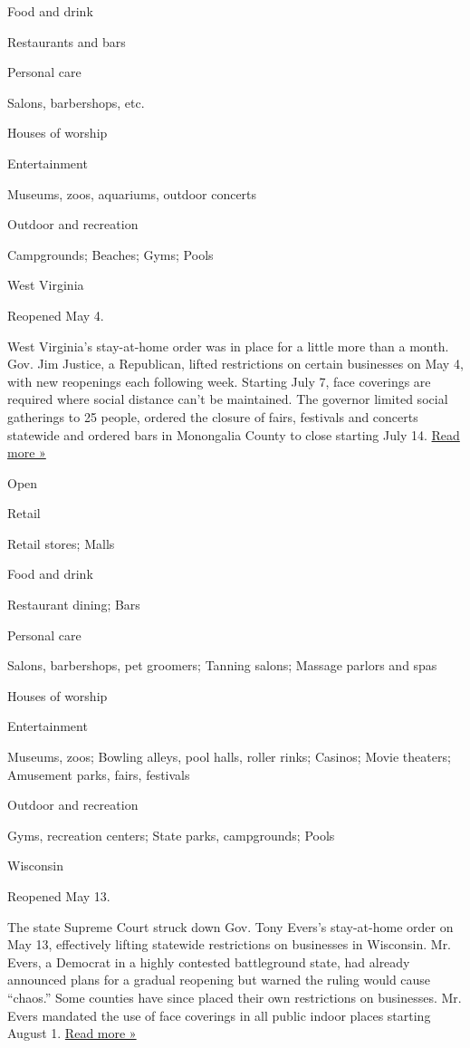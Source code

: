 Food and drink

Restaurants and bars

Personal care

Salons, barbershops, etc.

Houses of worship

Entertainment

Museums, zoos, aquariums, outdoor concerts

Outdoor and recreation

Campgrounds; Beaches; Gyms; Pools

West Virginia

Reopened May 4.

West Virginia's stay-at-home order was in place for a little more than a
month. Gov. Jim Justice, a Republican, lifted restrictions on certain
businesses on May 4, with new reopenings each following week. Starting
July 7, face coverings are required where social distance can't be
maintained. The governor limited social gatherings to 25 people, ordered
the closure of fairs, festivals and concerts statewide and ordered bars
in Monongalia County to close starting July 14.
\href{https://www.wvnstv.com/top-stories/coming-soon-wv-covid-19-update-july-13-2020/}{Read
more »}

Open

Retail

Retail stores; Malls

Food and drink

Restaurant dining; Bars

Personal care

Salons, barbershops, pet groomers; Tanning salons; Massage parlors and
spas

Houses of worship

Entertainment

Museums, zoos; Bowling alleys, pool halls, roller rinks; Casinos; Movie
theaters; Amusement parks, fairs, festivals

Outdoor and recreation

Gyms, recreation centers; State parks, campgrounds; Pools

Wisconsin

Reopened May 13.

The state Supreme Court struck down Gov. Tony Evers's stay-at-home order
on May 13, effectively lifting statewide restrictions on businesses in
Wisconsin. Mr. Evers, a Democrat in a highly contested battleground
state, had already announced plans for a gradual reopening but warned
the ruling would cause ``chaos.'' Some counties have since placed their
own restrictions on businesses. Mr. Evers mandated the use of face
coverings in all public indoor places starting August 1.
\href{https://www.jsonline.com/story/news/2020/05/14/wisconsin-bars-hair-salons-dine-restaurants-open-after-supreme-court-ruling-stay-home-order-evers/5194195002/}{Read
more »}

